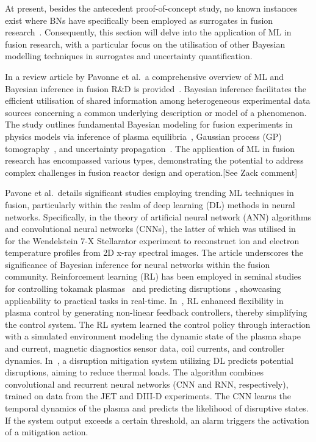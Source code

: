 \documentclass[journal]{IEEEtran}
\begin{document}
At present, besides the antecedent proof-of-concept study, no known instances exist where BNs have specifically been employed as surrogates in fusion research~\cite{Griffiths2024}. Consequently, this section will delve into the application of ML in fusion research, with a particular focus on the utilisation of other Bayesian modelling techniques in surrogates and uncertainty quantification.

In a review article by Pavonne et al.\ a comprehensive overview of ML and Bayesian inference in fusion R\&D is provided~\cite{Pavone2023}. Bayesian inference facilitates the efficient utilisation of shared information among heterogeneous experimental data sources concerning a common underlying description or model of a phenomenon. The study outlines fundamental Bayesian modeling for fusion experiments in physics models via inference of plasma equilibria~\cite{Svensson2003, Svensson2004}, Gaussian process (GP) tomography~\cite{Svensson2011}, and uncertainty propagation~\cite{Fischer2020, Fischer2010}. The application of ML in fusion research has encompassed various types, demonstrating the potential to address complex challenges in fusion reactor design and operation.[See Zack comment]

Pavone et al.~details significant studies employing trending ML techniques in fusion, particularly within the realm of deep learning (DL) methods in neural networks. Specifically, in the theory of artificial neural network (ANN) algorithms and convolutional neural networks (CNNs), the latter of which was utilised in~\cite{Pavone2019} for the Wendelstein 7-X Stellarator experiment to reconstruct ion and electron temperature profiles from 2D x-ray spectral images. The article underscores the significance of Bayesian inference for neural networks within the fusion community. Reinforcement learning (RL) has been employed in seminal studies for controlling tokamak plasmas~\cite{Degrave2022} and predicting disruptions~\cite{Kates2019}, showcasing applicability to practical tasks in real-time. In~\cite{Degrave2022}, RL enhanced flexibility in plasma control by generating non-linear feedback controllers, thereby simplifying the control system. The RL system learned the control policy through interaction with a simulated environment modeling the dynamic state of the plasma shape and current, magnetic diagnostics sensor data, coil currents, and controller dynamics. In~\cite{Kates2019}, a disruption mitigation system utilizing DL predicts potential disruptions, aiming to reduce thermal loads. The algorithm combines convolutional and recurrent neural networks (CNN and RNN, respectively), trained on data from the JET and DIII-D experiments. The CNN learns the temporal dynamics of the plasma and predicts the likelihood of disruptive states. If the system output exceeds a certain threshold, an alarm triggers the activation of a mitigation action. 
\end{document}
